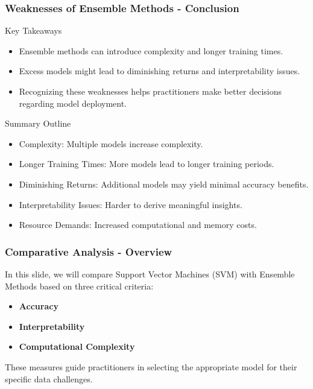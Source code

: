 \documentclass[aspectratio=169]{beamer}
\begin{document}
\begin{frame}[fragile]
    \frametitle{Weaknesses of Ensemble Methods - Conclusion}
    \begin{block}{Key Takeaways}
        \begin{itemize}
            \item Ensemble methods can introduce complexity and longer training times.
            \item Excess models might lead to diminishing returns and interpretability issues.
            \item Recognizing these weaknesses helps practitioners make better decisions regarding model deployment.
        \end{itemize}
    \end{block}
    
    \begin{block}{Summary Outline}
        \begin{itemize}
            \item Complexity: Multiple models increase complexity.
            \item Longer Training Times: More models lead to longer training periods.
            \item Diminishing Returns: Additional models may yield minimal accuracy benefits.
            \item Interpretability Issues: Harder to derive meaningful insights.
            \item Resource Demands: Increased computational and memory costs.
        \end{itemize}
    \end{block}
\end{frame}

\begin{frame}
    \titlepage
\end{frame}

\begin{frame}
    \frametitle{Comparative Analysis - Overview}
    In this slide, we will compare Support Vector Machines (SVM) with Ensemble Methods based on three critical criteria:
    \begin{itemize}
        \item \textbf{Accuracy}
        \item \textbf{Interpretability}
        \item \textbf{Computational Complexity}
    \end{itemize}
    These measures guide practitioners in selecting the appropriate model for their specific data challenges.
\end{frame}
\end{document}
